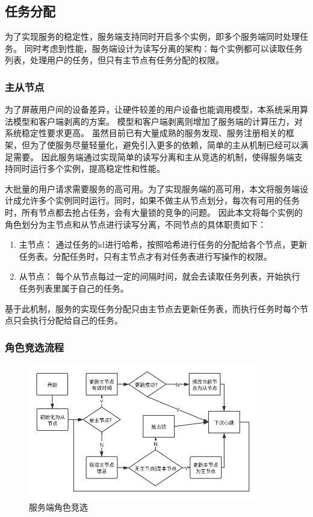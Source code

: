 \subsection{任务分配}
为了实现服务的稳定性，服务端支持同时开启多个实例，即多个服务端同时处理任务。
同时考虑到性能，服务端设计为读写分离的架构：每个实例都可以读取任务列表，处理用户的任务，但只有主节点有任务分配的权限。


\subsubsection{主从节点}
为了屏蔽用户间的设备差异，让硬件较差的用户设备也能调用模型，本系统采用算法模型和客户端剥离的方案。
模型和客户端剥离则增加了服务端的计算压力，对系统稳定性要求更高。
虽然目前已有大量成熟的服务发现、服务注册相关的框架，但为了使服务尽量轻量化，避免引入更多的依赖，简单的主从机制已经可以满足需要。
因此服务端通过实现简单的读写分离和主从竞选的机制，使得服务端支持同时运行多个实例，提高稳定性和性能。

大批量的用户请求需要服务的高可用。为了实现服务端的高可用，本文将服务端设计成允许多个实例同时运行。同时，如果不做主从节点划分，每次有可用的任务时，所有节点都去抢占任务，会有大量锁的竞争的问题。
因此本文将每个实例的角色划分为主节点和从节点进行读写分离，不同节点的具体职责如下：
\begin{enumerate}
    \item 主节点： 通过任务的id进行哈希，按照哈希进行任务的分配给各个节点，更新任务表。分配任务时，只有主节点才有对任务表进行写操作的权限。

    \item 从节点： 每个从节点每过一定的间隔时间，就会去读取任务列表，开始执行任务列表里属于自己的任务。

\end{enumerate}

基于此机制，服务的实现任务分配只由主节点去更新任务表，而执行任务时每个节点只会执行分配给自己的任务。

\subsubsection{角色竞选流程}

\begin{figure}
    \centering
    \includegraphics[width=10cm]{images/slave-master.png}
    \caption{服务端角色竞选}
    \label{fig:slave_master}
\end{figure}

